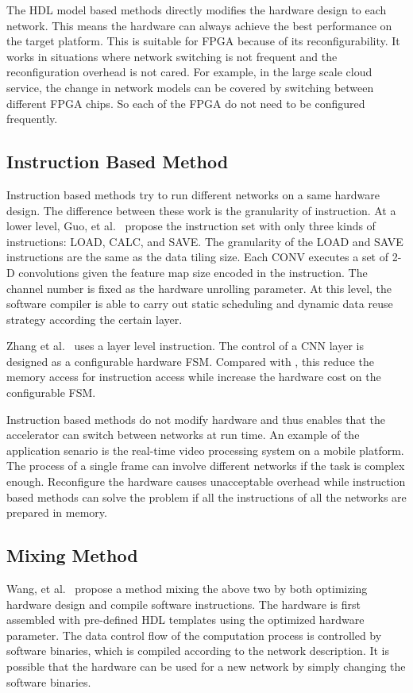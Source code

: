 The HDL model based methods directly modifies the hardware design to each network. This means the hardware can always achieve the best performance on the target platform. This is suitable for FPGA because of its reconfigurability. It works in situations where network switching is not frequent and the reconfiguration overhead is not cared. For example, in the large scale cloud service, the change in network models can be covered by switching between different FPGA chips. So each of the FPGA do not need to be configured frequently.

\subsection{Instruction Based Method}

Instruction based methods try to run different networks on a same hardware design. The difference between these work is the granularity of instruction. At a lower level, Guo, et al.~\cite{guo2017angel} propose the instruction set with only three kinds of instructions: LOAD, CALC, and SAVE. The granularity of the LOAD and SAVE instructions are the same as the data tiling size. Each CONV executes a set of 2-D convolutions given the feature map size encoded in the instruction. The channel number is fixed as the hardware unrolling parameter. At this level, the software compiler is able to carry out static scheduling and dynamic data reuse strategy according the certain layer. 

Zhang et al.~\cite{zhang2016caffeine} uses a layer level instruction. The control of a CNN layer is designed as a configurable hardware FSM. Compared with \cite{guo2017angel}, this reduce the memory access for instruction access while increase the hardware cost on the configurable FSM.

Instruction based methods do not modify hardware and thus enables that the accelerator can switch between networks at run time. An example of the application senario is the real-time video processing system on a mobile platform. The process of a single frame can involve different networks if the task is complex enough. Reconfigure the hardware causes unacceptable overhead while instruction based methods can solve the problem if all the instructions of all the networks are prepared in memory. 

\subsection{Mixing Method}
Wang, et al.~\cite{wang2016deepburning} propose a method mixing the above two by both optimizing hardware design and compile software instructions. The hardware is first assembled with pre-defined HDL templates using the optimized hardware parameter. The data control flow of the computation process is controlled by software binaries, which is compiled according to the network description. It is possible that the hardware can be used for a new network by simply changing the software binaries. 


